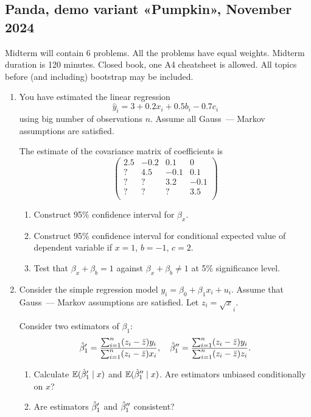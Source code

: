 \subsection{Panda, demo variant «Pumpkin», November 2024}

Midterm will contain 6 problems. 
All the problems have equal weights. 
Midterm duration is 120 minutes. 
Closed book, one A4 cheatsheet is allowed.
All topics before (and including) bootstrap may be included. 

\begin{enumerate}
    \item You have estimated the linear regression 
    \[
    \hat y_i  = 3 + 0.2 x_i + 0.5 b_i - 0.7 c_i
    \]
    using big number of observations $n$. 
    Assume all Gauss~— Markov assumptions are satisfied. 

    The estimate of the covariance matrix of coefficients is 
    \[
    \begin{pmatrix}
        2.5 & -0.2 & 0.1  & 0 \\
        ?   &  4.5 & -0.1 & 0.1 \\
        ?   &   ?  & 3.2  & -0.1 \\
        ?   &   ?  &  ?   &  3.5 \\       
    \end{pmatrix}
    \]
    \begin{enumerate}
        \item Construct 95\% confidence interval for $\beta_x$.
        \item Construct 95\% confidence interval for conditional expected value of dependent variable if $x = 1$, $b = -1$, $c = 2$.
        \item Test that $\beta_x + \beta_b = 1$ against $\beta_ x + \beta_b \neq 1$ at 5\% significance level.
    \end{enumerate}


    \item Consider the simple regression model $y_i = \beta_0 + \beta_1 x_i + u_i$.
    Assume that Gauss~— Markov assumptions are satisfied.
    Let $z_i = \sqrt{x}_i$.

    Consider two estimators of $\beta_1$:
    \[
    \hat{\beta}_1' = \frac{\sum_{i=1}^n(z_i - \bar z)y_i}{\sum_{i=1}^n(z_i - \bar z)x_i}, \quad \hat{\beta}_1'' = \frac{\sum_{i=1}^n(z_i - \bar z)y_i}{\sum_{i=1}^n(z_i - \bar z)z_i}.
    \]
    \begin{enumerate}
        \item Calculate $\operatorname{\mathbb{E}}(\hat{\beta}_1' \mid x)$ and $\operatorname{\mathbb{E}}(\hat{\beta}_1'' \mid x)$. Are estimators unbiased conditionally on $x$?
        \item Are estimators $\hat{\beta}_1'$ and $\hat{\beta}_1''$ consistent?
    \end{enumerate}



\end{enumerate}
